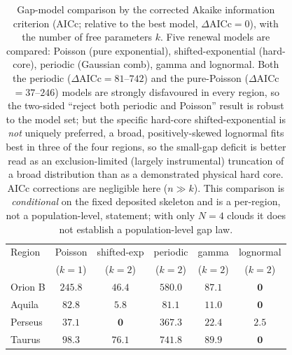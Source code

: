 \documentclass[usenatbib,twoside,twocolumn]{mnras}
\begin{document}
\begin{table}
\caption{Gap-model comparison by the corrected Akaike information criterion (AICc; relative to the best model, $\Delta$AICc$=0$), with the number of free parameters $k$. Five renewal models are compared: Poisson (pure exponential), shifted-exponential (hard-core), periodic (Gaussian comb), gamma and lognormal. Both the periodic ($\Delta$AICc$=81$--$742$) and the pure-Poisson ($\Delta$AICc$=37$--$246$) models are strongly disfavoured in every region, so the two-sided ``reject both periodic and Poisson'' result is robust to the model set; but the specific hard-core shifted-exponential is \emph{not} uniquely preferred, a broad, positively-skewed lognormal fits best in three of the four regions, so the small-gap deficit is better read as an exclusion-limited (largely instrumental) truncation of a broad distribution than as a demonstrated physical hard core. AICc corrections are negligible here ($n\gg k$). This comparison is \emph{conditional} on the fixed deposited skeleton and is a per-region, not a population-level, statement; with only $N=4$ clouds it does not establish a population-level gap law.}
\label{tab:aic}
\footnotesize
\setlength{\tabcolsep}{3pt}
\begin{tabular}{lccccc}
\toprule
Region & Poisson & shifted-exp & periodic & gamma & lognormal \\
       & ($k{=}1$) & ($k{=}2$) & ($k{=}2$) & ($k{=}2$) & ($k{=}2$) \\
\midrule
Orion B & $245.8$ & $46.4$ & $580.0$ & $87.1$ & $\mathbf{0}$ \\
Aquila  & $82.8$  & $5.8$  & $81.1$  & $11.0$ & $\mathbf{0}$ \\
Perseus & $37.1$  & $\mathbf{0}$ & $367.3$ & $22.4$ & $2.5$ \\
Taurus  & $98.3$  & $76.1$ & $741.8$ & $89.9$ & $\mathbf{0}$ \\
\bottomrule
\end{tabular}
\end{table}
\end{document}
